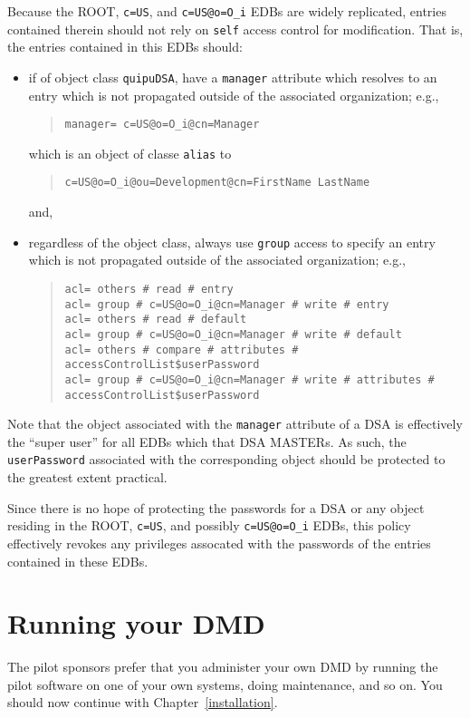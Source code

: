 Because the ROOT, \verb"c=US", and \verb"c=US@o=O_i" EDBs are widely
replicated,
entries contained therein should not rely on \verb"self" access control
for modification.
That is,
the entries contained in this EDBs should:
\begin{itemize}
\item	if of object class \verb"quipuDSA", have a \verb"manager"
	attribute which resolves to an entry which is not propagated outside
	of the associated organization; e.g.,
\begin{quote}\small\begin{verbatim}
manager= c=US@o=O_i@cn=Manager
\end{verbatim}\end{quote}
which is an object of classe \verb"alias" to
\begin{quote}\small\begin{verbatim}
c=US@o=O_i@ou=Development@cn=FirstName LastName
\end{verbatim}\end{quote}
	and,

\item	regardless of the object class,
	always use \verb"group" access to specify an entry which is not
	propagated outside of the associated organization; e.g.,
\begin{quote}\scriptsize\begin{verbatim}
acl= others # read # entry
acl= group # c=US@o=O_i@cn=Manager # write # entry
acl= others # read # default
acl= group # c=US@o=O_i@cn=Manager # write # default
acl= others # compare # attributes # accessControlList$userPassword
acl= group # c=US@o=O_i@cn=Manager # write # attributes # accessControlList$userPassword
\end{verbatim}\end{quote}
\end{itemize}
Note that the object associated with the \verb"manager" attribute of a DSA
is effectively the ``super user'' for all EDBs which that DSA MASTERs.
As such,
the \verb"userPassword" associated with the corresponding object should be 
protected to the greatest extent practical.

Since there is no hope of protecting the passwords for a DSA or any object
residing in the ROOT, \verb"c=US", and possibly \verb"c=US@o=O_i" EDBs,
this policy effectively revokes any privileges assocated with the passwords of
the entries contained in these EDBs.

\section	{Running your DMD}
The pilot sponsors prefer that you administer your own DMD by running the
pilot software on one of your own systems,
doing maintenance,
and so on.
You should now continue with Chapter~\ref{installation}.

